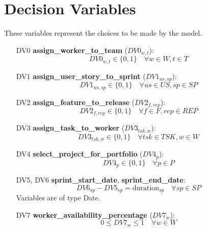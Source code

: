 \documentclass{article}
\begin{document}
\section{Decision Variables}
These variables represent the choices to be made by the model.
\begin{itemize}
    \item [DV0] \textbf{assign\_worker\_to\_team} ($DV0_{w,t}$):
    $$ DV0_{w,t} \in \{0,1\} \quad \forall w \in W, t \in T $$
    \item [DV1] \textbf{assign\_user\_story\_to\_sprint} ($DV1_{us,sp}$):
    $$ DV1_{us,sp} \in \{0,1\} \quad \forall us \in US, sp \in SP $$
    \item [DV2] \textbf{assign\_feature\_to\_release} ($DV2_{f,rep}$):
    $$ DV2_{f,rep} \in \{0,1\} \quad \forall f \in F, rep \in REP $$
    \item [DV3] \textbf{assign\_task\_to\_worker} ($DV3_{tsk,w}$):
    $$ DV3_{tsk,w} \in \{0,1\} \quad \forall tsk \in TSK, w \in W $$
    \item [DV4] \textbf{select\_project\_for\_portfolio} ($DV4_p$):
    $$ DV4_p \in \{0,1\} \quad \forall p \in P $$
    \item [DV5, DV6] \textbf{sprint\_start\_date}, \textbf{sprint\_end\_date}:
    $$ DV6_{sp} - DV5_{sp} = \text{duration}_{sp} \quad \forall sp \in SP $$
    Variables are of type Date.
    \item [DV7] \textbf{worker\_availability\_percentage} ($DV7_w$):
    $$ 0 \le DV7_w \le 1 \quad \forall w \in W $$
\end{itemize}
\end{document}
